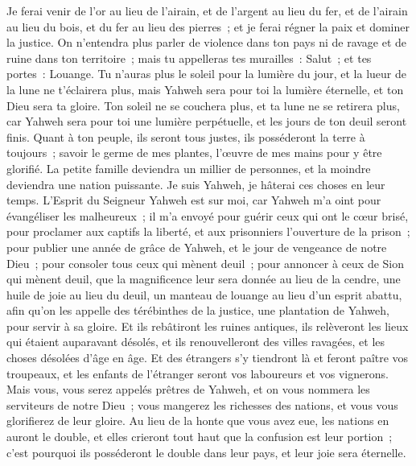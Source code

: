 \begin{multicols}{2}
Je ferai venir de l'or au lieu de l'airain, et de l'argent au lieu du fer, et de l'airain au lieu du bois, et du fer au lieu des pierres~; et je ferai régner la paix et dominer la justice.
On n'entendra plus parler de violence dans ton pays ni de ravage et de ruine dans ton territoire~; mais tu appelleras tes murailles~: Salut~; et tes portes~: Louange.
Tu n'auras plus le soleil pour la lumière du jour, et la lueur de la lune ne t'éclairera plus, mais Yahweh sera pour toi la lumière éternelle, et ton Dieu sera ta gloire.
Ton soleil ne se couchera plus, et ta lune ne se retirera plus, car Yahweh sera pour toi une lumière perpétuelle, et les jours de ton deuil seront finis.
Quant à ton peuple, ils seront tous justes, ils posséderont la terre à toujours~; savoir le germe de mes plantes, l'œuvre de mes mains pour y être glorifié.
La petite famille deviendra un millier de personnes, et la moindre deviendra une nation puissante. Je suis Yahweh, je hâterai ces choses en leur temps.
\VerseOne{}L'Esprit du Seigneur Yahweh est sur moi, car Yahweh m'a oint pour évangéliser les malheureux~; il m'a envoyé pour guérir ceux qui ont le cœur brisé, pour proclamer aux captifs la liberté, et aux prisonniers l'ouverture de la prison~;
pour publier une année de grâce de Yahweh, et le jour de vengeance de notre Dieu~; pour consoler tous ceux qui mènent deuil~;
pour annoncer à ceux de Sion qui mènent deuil, que la magnificence leur sera donnée au lieu de la cendre, une huile de joie au lieu du deuil, un manteau de louange au lieu d'un esprit abattu, afin qu'on les appelle des térébinthes de la justice, une plantation de Yahweh, pour servir à sa gloire.
Et ils rebâtiront les ruines antiques, ils relèveront les lieux qui étaient auparavant désolés, et ils renouvelleront des villes ravagées, et les choses désolées d'âge en âge.
Et des étrangers s'y tiendront là et feront paître vos troupeaux, et les enfants de l'étranger seront vos laboureurs et vos vignerons.
Mais vous, vous serez appelés prêtres de Yahweh, et on vous nommera les serviteurs de notre Dieu~; vous mangerez les richesses des nations, et vous vous glorifierez de leur gloire.
Au lieu de la honte que vous avez eue, les nations en auront le double, et elles crieront tout haut que la confusion est leur portion~; c'est pourquoi ils posséderont le double dans leur pays, et leur joie sera éternelle.

\end{multicols}

